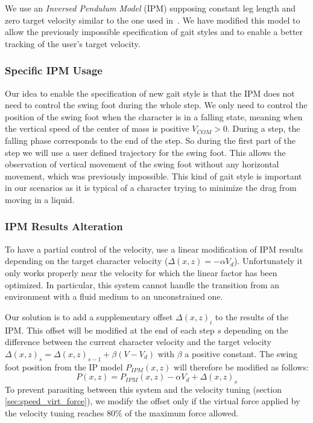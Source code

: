 \documentclass[runningheads,a4paper,10pt]{llncs}
\begin{document}
We use an \textit{Inversed Pendulum Model} (IPM) supposing constant leg length and zero target velocity similar to the one used in~\citep{coros2010generalized}. We have modified this model to allow the previously impossible specification of gait styles and to enable a better tracking of the user's target velocity.

\subsubsection{Specific IPM Usage}
\label{sec:specific_ipm}

Our idea to enable the specification of new gait style is that the IPM does not need to control the swing foot during the whole step. We only need to control the position of the swing foot when the character is in a falling state, meaning when the vertical speed of the center of mass is positive $V_{COM}>0$. During a step, the falling phase corresponds to the end of the step. So during the first part of the step we will use a user defined trajectory for the swing foot. This allows the observation of vertical movement of the swing foot without any horizontal movement, which was previously impossible. This kind of gait style is important in our scenarios as it is typical of a character trying to minimize the drag from moving in a liquid.

\subsubsection{IPM Results Alteration}
\label{sec:ipm_alt}

To have a partial control of the velocity, \citep{coros2010generalized} use a linear modification of IPM results depending on the target character velocity ($\Delta(x,z)=-\alpha V_d$). Unfortunately it only works properly near the velocity for which the linear factor has been optimized. In particular, this system cannot handle the transition from an environment with a fluid medium to an unconstrained one.

Our solution is to add a supplementary offset $\Delta(x,z)_i$ to the results of the IPM. This offset will be modified at the end of each step $s$ depending on the difference between the current character velocity and the target velocity $\Delta(x,z)_s = \Delta(x,z)_{s-1}+\beta(V-V_d)$ with $\beta$ a positive constant. The swing foot position from the IP model $P_{IPM}(x,z)$ will therefore be modified as follows:
$$
P(x,z) = P_{IPM}(x,z) - \alpha V_d + \Delta(x,z)_s
$$ 
To prevent parasiting between this system and the velocity tuning (section \ref{sec:speed_virt_force}), we modify the offset only if the virtual force applied by the velocity tuning reaches $80\%$ of the maximum force allowed. 
\end{document}
